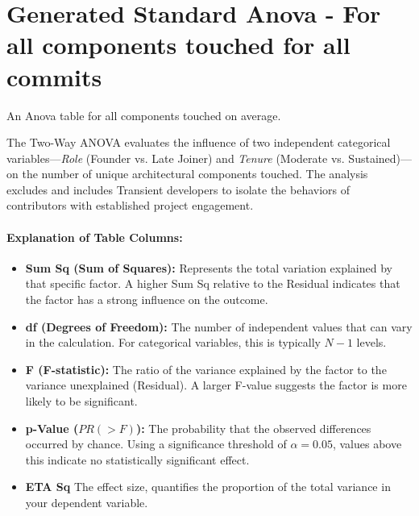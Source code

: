 \section{Generated Standard Anova - For all components touched for all commits} 
\label{sec:codebase_graph_latex.repository_graph.component_time_series.generated_standard_anovaall commits} 
An Anova table for all components touched on average. 

The Two-Way ANOVA evaluates the influence of two independent categorical variables—\textit{Role} (Founder vs. Late Joiner) and \textit{Tenure} (Moderate vs. Sustained)—on the number of unique architectural components touched. The analysis excludes and includes Transient developers to isolate the behaviors of contributors with established project engagement.

\paragraph{Explanation of Table Columns:}
\begin{itemize}
    \item \textbf{Sum Sq (Sum of Squares):} Represents the total variation explained by that specific factor. A higher Sum Sq relative to the Residual indicates that the factor has a strong influence on the outcome.
    \item \textbf{df (Degrees of Freedom):} The number of independent values that can vary in the calculation. For categorical variables, this is typically $N-1$ levels.
    \item \textbf{F (F-statistic):} The ratio of the variance explained by the factor to the variance unexplained (Residual). A larger F-value suggests the factor is more likely to be significant.
    \item \textbf{p-Value ($PR(>F)$):} The probability that the observed differences occurred by chance. Using a significance threshold of $\alpha = 0.05$, values above this indicate no statistically significant effect.
    \item \textbf{ETA Sq} The effect size, quantifies the proportion of the total variance in your dependent variable. 
\end{itemize}

